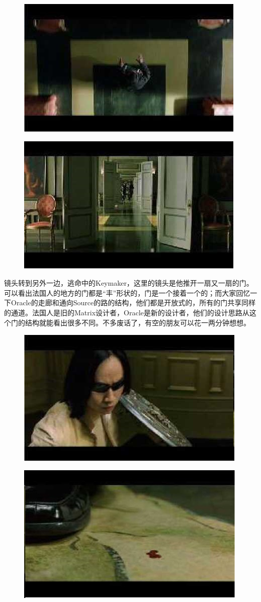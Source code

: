 \documentclass{ctexart}
\begin{document}
\begin{figure}[htb]
\centering
\includegraphics[width=0.5\linewidth]{fig/read_reloaded-122}
\end{figure}

\begin{figure}[!htb]
\centering
\includegraphics[width=0.5\linewidth]{fig/read_reloaded-122-1}
\end{figure}

镜头转到另外一边，逃命中的Keymaker，这里的镜头是他推开一扇又一扇的门。可以看出法国人的地方的门都是“丰”形状的，门是一个接着一个的；而大家回忆一下Oracle的走廊和通向Source的路的结构，他们都是开放式的，所有的门共享同样的通道。法国人是旧的Matrix设计者，Oracle是新的设计者，他们的设计思路从这个门的结构就能看出很多不同。不多废话了，有空的朋友可以花一两分钟想想。

\begin{figure}[htb]
\centering
\includegraphics[width=0.5\linewidth]{fig/read_reloaded-123}
\end{figure}

\begin{figure}[htb]
\centering
\includegraphics[width=0.5\linewidth]{fig/read_reloaded-123-1}
\end{figure}
\end{document}
